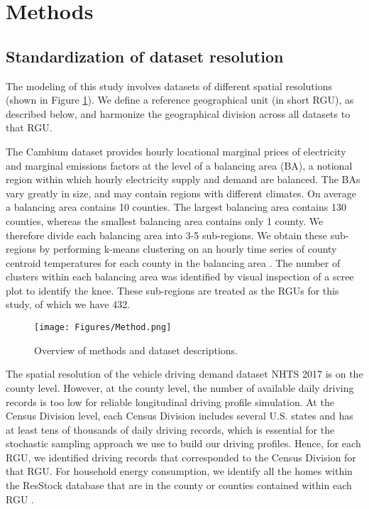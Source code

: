 \documentclass[11pt,preprint]{elsarticle}
\begin{document}
\section{Methods}

\subsection{Standardization of dataset resolution}\label{sec:harmony}

The modeling of this study involves datasets of different spatial resolutions (shown in Figure \ref{fig:method}). We define a reference geographical unit (in short RGU), as described below, and harmonize the geographical division across all datasets to that RGU.

The Cambium dataset provides hourly locational marginal prices of electricity and marginal emissions factors at the level of a balancing area (BA), a notional region within which hourly electricity supply and demand are balanced. The BAs vary greatly in size, and may contain regions with different climates. On average a balancing area contains 10 counties. The largest balancing area contains 130 counties, whereas the smallest balancing area contains only 1 county. We therefore divide each balancing area into 3-5 sub-regions. We obtain these sub-regions by performing k-means clustering on an hourly time series of county centroid temperatures for each county in the balancing area \cite{noauthor_weather_2024}. The number of clusters within each balancing area was identified by visual inspection of a scree plot to identify the knee. These sub-regions are treated as the RGUs for this study, of which we have 432.

\begin{figure}
    \centering
    \texttt{[image: Figures/Method.png]}
    \caption{Overview of methods and dataset descriptions.}
    \label{fig:method}
\end{figure}

The spatial resolution of the vehicle driving demand dataset NHTS 2017 is on the county level. However, at the county level, the number of available daily driving records is too low for reliable longitudinal driving profile simulation. At the Census Division level, each Census Division includes several U.S. states and has at least tens of thousands of daily driving records, which is essential for the stochastic sampling approach we use to build our driving profiles. Hence, for each RGU, we identified driving records that corresponded to the Census Division for that RGU. For household energy consumption, we identify all the homes within the ResStock database that are in the county or counties contained within each RGU \cite{wilson_end-use_2022}.
\end{document}
